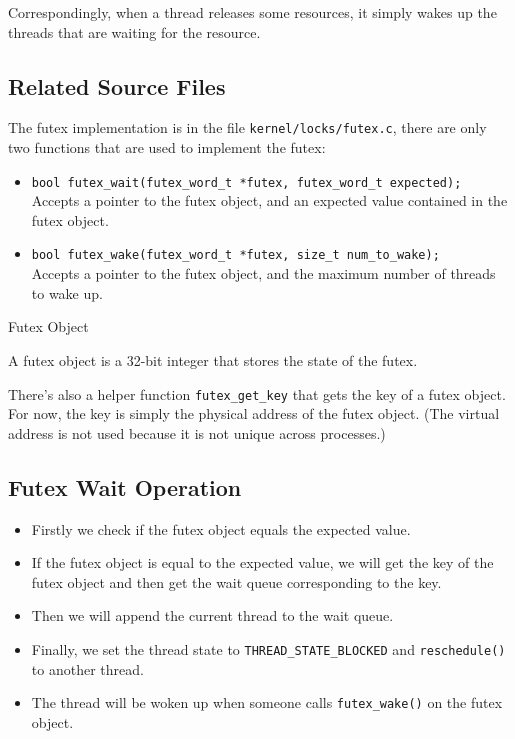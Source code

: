 Correspondingly, when a thread releases some resources, it simply wakes up the threads
that are waiting for the resource.

\subsection{Related Source Files}

The futex implementation is in the file \texttt{kernel/locks/futex.c}, there are only
two functions that are used to implement the futex:

\begin{itemize}
    \item \texttt{bool futex\_wait(futex\_word\_t *futex, futex\_word\_t expected);} \\
          Accepts a pointer to the futex object, and an expected value contained in the
          futex object.
    \item \texttt{bool futex\_wake(futex\_word\_t *futex, size\_t num\_to\_wake);} \\
          Accepts a pointer to the futex object, and the maximum number of threads to
          wake up.
\end{itemize}

\begin{note*}{Futex Object}
    \item A futex object is a 32-bit integer that stores the state of the futex.
\end{note*}

There's also a helper function \texttt{futex\_get\_key} that gets the key of a futex object.
For now, the key is simply the physical address of the futex object. (The virtual address
is not used because it is not unique across processes.)

\subsection{Futex Wait Operation}

\begin{itemize}
    \item Firstly we check if the futex object equals the expected value.
    \item If the futex object is equal to the expected value, we will get the key of
          the futex object and then get the wait queue corresponding to the key.
    \item Then we will append the current thread to the wait queue.
    \item Finally, we set the thread state to \texttt{THREAD\_STATE\_BLOCKED} and \texttt{reschedule()}
          to another thread.
    \item The thread will be woken up when someone calls \texttt{futex\_wake()} on
          the futex object.
\end{itemize}

